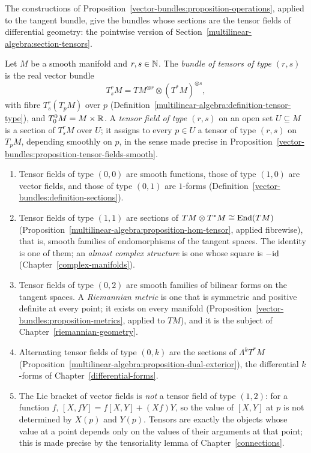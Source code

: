 The constructions of Proposition~\ref{vector-bundles:proposition-operations}, applied to the tangent bundle, give the bundles whose sections are the tensor fields of differential
geometry: the pointwise version of Section~\ref{multilinear-algebra:section-tensors}.

\begin{definition}\label{vector-bundles:definition-tensor-fields}
Let $M$ be a smooth manifold and $r, s \in \mathbb{N}$. The \emph{bundle of tensors of type $(r,s)$} is the real vector bundle
\[
T^r_sM = TM^{\otimes r} \otimes (T^*M)^{\otimes s},
\]
with fibre $T^r_s(T_pM)$ over $p$ (Definition~\ref{multilinear-algebra:definition-tensor-type}), and $T^0_0M = M \times \mathbb{R}$. A \emph{tensor field of type $(r,s)$} on an open set $U \subseteq M$ is a
section of $T^r_sM$ over $U$; it assigns to every $p \in U$ a tensor of type $(r,s)$ on $T_pM$, depending smoothly on $p$, in the sense made precise in
Proposition~\ref{vector-bundles:proposition-tensor-fields-smooth}.
\end{definition}

\begin{example}\label{vector-bundles:example-tensor-fields}
\begin{enumerate}
\item Tensor fields of type $(0,0)$ are smooth functions, those of type $(1,0)$ are vector fields, and those of type $(0,1)$ are $1$-forms
(Definition~\ref{vector-bundles:definition-sections}).
\item Tensor fields of type $(1,1)$ are sections of $TM \otimes T^*M \cong \operatorname{End}(TM)$ (Proposition~\ref{multilinear-algebra:proposition-hom-tensor}, applied fibrewise), that is, smooth families of
endomorphisms of the tangent spaces. The identity is one of them; an \emph{almost complex structure} is one whose square is $-\mathrm{id}$ (Chapter~\ref{complex-manifolds}).
\item Tensor fields of type $(0,2)$ are smooth families of bilinear forms on the tangent spaces. A \emph{Riemannian metric} is one that is symmetric and positive definite at every point; it exists
on every manifold (Proposition~\ref{vector-bundles:proposition-metrics}, applied to $TM$), and it is the subject of Chapter~\ref{riemannian-geometry}.
\item Alternating tensor fields of type $(0,k)$ are the sections of $\Lambda^kT^*M$ (Proposition~\ref{multilinear-algebra:proposition-dual-exterior}), the differential $k$-forms of
Chapter~\ref{differential-forms}.
\item The Lie bracket of vector fields is \emph{not} a tensor field of type $(1,2)$: for a function $f$, $[X, fY] = f[X, Y] + (Xf)Y$, so the value of $[X, Y]$ at $p$ is not determined by
$X(p)$ and $Y(p)$. Tensors are exactly the objects whose value at a point depends only on the values of their arguments at that point; this is made precise by the tensoriality lemma of
Chapter~\ref{connections}.
\end{enumerate}
\end{example}

